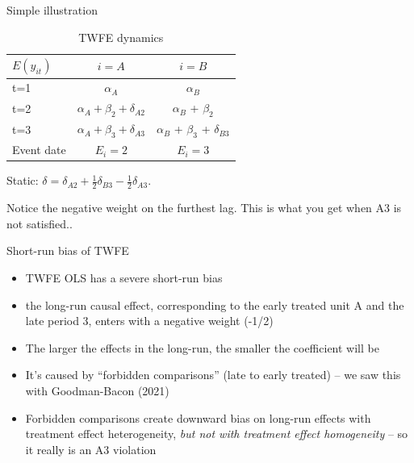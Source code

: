 \documentclass{beamer}
\begin{document}
\begin{frame}{Simple illustration}


\begin{table}[htb]\centering
\scriptsize
\caption{TWFE dynamics}
\centering
\begin{threeparttable}
\begin{tabular}{l*{2}{c}}
\toprule
\multicolumn{1}{l}{$E(y_{it})$ }&
\multicolumn{1}{c}{\textbf{$i=A$ }}&
\multicolumn{1}{c}{\textbf{$i=B$ }}\\
\midrule
t=1 & $\alpha_A$ & $\alpha_B$ \\
t=2 & $\alpha_A + \beta_2 + \delta_{A2}$ & $\alpha_B$ + $\beta_2$ \\
t=3 & $\alpha_A + \beta_3 + \delta_{A3}$ & $\alpha_B$ + $\beta_3$ + $\delta_{B3}$ \\
\midrule
Event date & $E_i=2$ & $E_i = 3$ \\
\bottomrule
\end{tabular}
\end{threeparttable}
\end{table}

Static: $\delta = \delta_{A2} + \frac{1}{2}\delta_{B3} - \frac{1}{2} \delta_{A3}$.  \\

\bigskip

Notice the negative weight on the furthest lag. This is what you get when A3 is not satisfied.. 

\end{frame}


\begin{frame}{Short-run bias of TWFE}

\begin{itemize}
\item TWFE OLS has a severe short-run bias
\item the long-run causal effect, corresponding to the early treated unit A and the late period 3, enters with a negative weight (-1/2)
\item The larger the effects in the long-run, the smaller the coefficient will be
\item It's caused by ``forbidden comparisons'' (late to early treated) -- we saw this with Goodman-Bacon (2021)
\item Forbidden comparisons create downward bias on long-run effects with treatment effect heterogeneity, \emph{but not with treatment effect homogeneity} -- so it really is an A3 violation
\end{itemize}

\end{frame}
\end{document}

